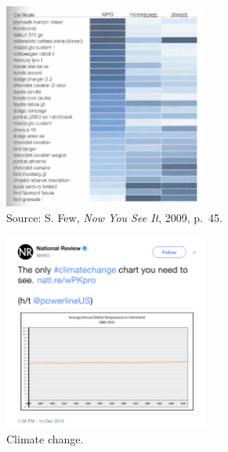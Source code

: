 \documentclass[
  letterpaper,
  DIV=11,
  numbers=noendperiod]{scrreprt}
\begin{document}
\hfill\break
\hfill\break
\hfill\break

\begin{figure}[H]

{\centering \includegraphics[width=0.6\textwidth,height=\textheight]{src/../images/heatmap.png}

}

\caption{Source: S. Few, \emph{Now You See It}, 2009, p.~45.}

\end{figure}%

\hfill\break
\hfill\break
\hfill\break

\begin{figure}[H]

{\centering \includegraphics[width=0.6\textwidth,height=\textheight]{src/../images/badviz1.png}

}

\caption{Climate change.}

\end{figure}%

\hfill\break
\hfill\break
\hfill\break
\end{document}
